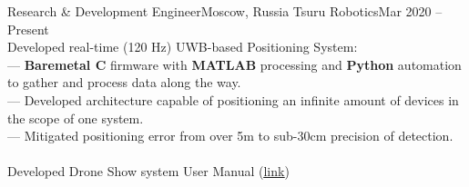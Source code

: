\resumeSubheading
  {Research \& Development Engineer}{Moscow, Russia}
  {Tsuru Robotics}{Mar 2020 -- Present}
      {\ \ \ \\}
      {Developed real-time (120 Hz) UWB-based Positioning System:}\\
      {— \textbf{Baremetal C} firmware with \textbf{MATLAB} processing and \textbf{Python} automation to gather and process data along the way.}\\
      {— Developed architecture capable of positioning an infinite amount of devices in the scope of one system.}\\
      {— Mitigated positioning error from over 5m to sub-30cm precision of detection.}\\
      {\ }\\
      {Developed Drone Show system User Manual (\href{https://1drv.ms/b/s!ArpOOOargz4JnrknqVsAlp5fFtk6iA}{\underline{link}})}\\